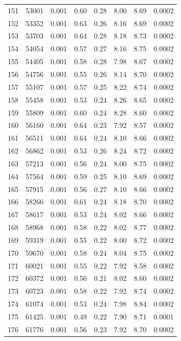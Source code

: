 \documentclass[11pt,a4paper]{article}
\begin{document}
\begin{center}
\begin{longtable}{@{}rrrrrrrr@{}}
151 & 53001 & 0.001 & 0.60 & 0.28 & 8.00 & 8.69 & 0.0002 \\
152 & 53352 & 0.001 & 0.63 & 0.26 & 8.16 & 8.69 & 0.0002 \\
153 & 53703 & 0.001 & 0.64 & 0.28 & 8.18 & 8.73 & 0.0002 \\
154 & 54054 & 0.001 & 0.57 & 0.27 & 8.16 & 8.75 & 0.0002 \\
155 & 54405 & 0.001 & 0.58 & 0.28 & 7.98 & 8.67 & 0.0002 \\
156 & 54756 & 0.001 & 0.55 & 0.26 & 8.14 & 8.70 & 0.0002 \\
157 & 55107 & 0.001 & 0.57 & 0.25 & 8.22 & 8.74 & 0.0002 \\
158 & 55458 & 0.001 & 0.53 & 0.24 & 8.26 & 8.65 & 0.0002 \\
159 & 55809 & 0.001 & 0.60 & 0.24 & 8.28 & 8.60 & 0.0002 \\
160 & 56160 & 0.001 & 0.64 & 0.23 & 7.92 & 8.57 & 0.0002 \\
161 & 56511 & 0.001 & 0.64 & 0.24 & 8.10 & 8.66 & 0.0002 \\
162 & 56862 & 0.001 & 0.53 & 0.26 & 8.24 & 8.72 & 0.0002 \\
163 & 57213 & 0.001 & 0.56 & 0.24 & 8.00 & 8.75 & 0.0002 \\
164 & 57564 & 0.001 & 0.59 & 0.25 & 8.10 & 8.69 & 0.0002 \\
165 & 57915 & 0.001 & 0.56 & 0.27 & 8.10 & 8.66 & 0.0002 \\
166 & 58266 & 0.001 & 0.61 & 0.24 & 8.18 & 8.70 & 0.0002 \\
167 & 58617 & 0.001 & 0.53 & 0.24 & 8.02 & 8.66 & 0.0002 \\
168 & 58968 & 0.001 & 0.58 & 0.22 & 8.02 & 8.77 & 0.0002 \\
169 & 59319 & 0.001 & 0.55 & 0.22 & 8.00 & 8.72 & 0.0002 \\
170 & 59670 & 0.001 & 0.58 & 0.24 & 8.04 & 8.75 & 0.0002 \\
171 & 60021 & 0.001 & 0.55 & 0.22 & 7.92 & 8.58 & 0.0002 \\
172 & 60372 & 0.001 & 0.56 & 0.21 & 8.02 & 8.60 & 0.0002 \\
173 & 60723 & 0.001 & 0.58 & 0.22 & 7.92 & 8.74 & 0.0002 \\
174 & 61074 & 0.001 & 0.53 & 0.24 & 7.98 & 8.84 & 0.0002 \\
175 & 61425 & 0.001 & 0.49 & 0.22 & 7.90 & 8.71 & 0.0001 \\
176 & 61776 & 0.001 & 0.56 & 0.23 & 7.92 & 8.70 & 0.0002 \\

\end{longtable}
\end{center}
\end{document}
